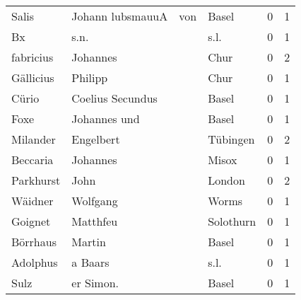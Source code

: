 \begin{tabular}{llllrr}
                    Salis &                  Johann  lubsmauuA &         von &                                       Basel &          0 &         1 \\
                       Bx &                               s.n. &             &                                        s.l. &          0 &         1 \\
                fabricius &                           Johannes &             &                                        Chur &          0 &         2 \\
                Gällicius &                            Philipp &             &                                        Chur &          0 &         1 \\
                    Cürio &                   Coelius Secundus &             &                                       Basel &          0 &         1 \\
                     Foxe &                       Johannes und &             &                                       Basel &          0 &         1 \\
                 Milander &                          Engelbert &             &                                    Tübingen &          0 &         2 \\
                 Beccaria &                           Johannes &             &                                       Misox &          0 &         1 \\
                Parkhurst &                               John &             &                                      London &          0 &         2 \\
                  Wäidner &                           Wolfgang &             &                                       Worms &          0 &         1 \\
                  Goignet &                           Matthfeu &             &                                   Solothurn &          0 &         1 \\
                 Börrhaus &                             Martin &             &                                       Basel &          0 &         1 \\
                 Adolphus &                            a Baars &             &                                        s.l. &          0 &         1 \\
                     Sulz &                          er Simon. &             &                                       Basel &          0 &         1 \\

\end{tabular}
